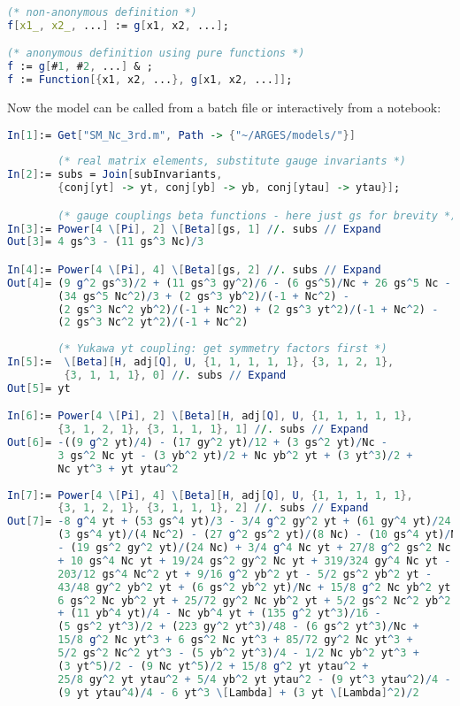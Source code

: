 \documentclass{scrartcl}
\begin{document}
\begin{lstlisting}[language=mathematica,mathescape,columns=flexible,backgroundcolor=\color{light-gray}]
(* non-anonymous definition *)
f[x1_, x2_, ...] := g[x1, x2, ...];

(* anonymous definition using pure functions *)
f := g[#1, #2, ...] & ;
f := Function[{x1, x2, ...}, g[x1, x2, ...]]; 
\end{lstlisting}
Now the model can be called from a batch file or interactively from a notebook:
\begin{lstlisting}[language=mathematica,mathescape,columns=flexible,backgroundcolor=\color{light-gray}]
In[1]:= Get["SM_Nc_3rd.m", Path -> {"~/ARGES/models/"}]
        
        (* real matrix elements, substitute gauge invariants *)        
In[2]:= subs = Join[subInvariants, 
        {conj[yt] -> yt, conj[yb] -> yb, conj[ytau] -> ytau}];

        (* gauge couplings beta functions - here just gs for brevity *)        
In[3]:= Power[4 \[Pi], 2] \[Beta][gs, 1] //. subs // Expand
Out[3]= 4 gs^3 - (11 gs^3 Nc)/3

In[4]:= Power[4 \[Pi], 4] \[Beta][gs, 2] //. subs // Expand
Out[4]= (9 g^2 gs^3)/2 + (11 gs^3 gy^2)/6 - (6 gs^5)/Nc + 26 gs^5 Nc - 
        (34 gs^5 Nc^2)/3 + (2 gs^3 yb^2)/(-1 + Nc^2) - 
        (2 gs^3 Nc^2 yb^2)/(-1 + Nc^2) + (2 gs^3 yt^2)/(-1 + Nc^2) - 
        (2 gs^3 Nc^2 yt^2)/(-1 + Nc^2)
        
        (* Yukawa yt coupling: get symmetry factors first *)
In[5]:=  \[Beta][H, adj[Q], U, {1, 1, 1, 1, 1}, {3, 1, 2, 1}, 
         {3, 1, 1, 1}, 0] //. subs // Expand
Out[5]= yt

In[6]:= Power[4 \[Pi], 2] \[Beta][H, adj[Q], U, {1, 1, 1, 1, 1}, 
        {3, 1, 2, 1}, {3, 1, 1, 1}, 1] //. subs // Expand
Out[6]= -((9 g^2 yt)/4) - (17 gy^2 yt)/12 + (3 gs^2 yt)/Nc - 
        3 gs^2 Nc yt - (3 yb^2 yt)/2 + Nc yb^2 yt + (3 yt^3)/2 + 
        Nc yt^3 + yt ytau^2
        
In[7]:= Power[4 \[Pi], 4] \[Beta][H, adj[Q], U, {1, 1, 1, 1, 1}, 
        {3, 1, 2, 1}, {3, 1, 1, 1}, 2] //. subs // Expand
Out[7]= -8 g^4 yt + (53 gs^4 yt)/3 - 3/4 g^2 gy^2 yt + (61 gy^4 yt)/24 - 
        (3 gs^4 yt)/(4 Nc^2) - (27 g^2 gs^2 yt)/(8 Nc) - (10 gs^4 yt)/Nc
        - (19 gs^2 gy^2 yt)/(24 Nc) + 3/4 g^4 Nc yt + 27/8 g^2 gs^2 Nc yt
        + 10 gs^4 Nc yt + 19/24 gs^2 gy^2 Nc yt + 319/324 gy^4 Nc yt - 
        203/12 gs^4 Nc^2 yt + 9/16 g^2 yb^2 yt - 5/2 gs^2 yb^2 yt - 
        43/48 gy^2 yb^2 yt + (6 gs^2 yb^2 yt)/Nc + 15/8 g^2 Nc yb^2 yt -
        6 gs^2 Nc yb^2 yt + 25/72 gy^2 Nc yb^2 yt + 5/2 gs^2 Nc^2 yb^2 yt
        + (11 yb^4 yt)/4 - Nc yb^4 yt + (135 g^2 yt^3)/16 - 
        (5 gs^2 yt^3)/2 + (223 gy^2 yt^3)/48 - (6 gs^2 yt^3)/Nc + 
        15/8 g^2 Nc yt^3 + 6 gs^2 Nc yt^3 + 85/72 gy^2 Nc yt^3 + 
        5/2 gs^2 Nc^2 yt^3 - (5 yb^2 yt^3)/4 - 1/2 Nc yb^2 yt^3 + 
        (3 yt^5)/2 - (9 Nc yt^5)/2 + 15/8 g^2 yt ytau^2 + 
        25/8 gy^2 yt ytau^2 + 5/4 yb^2 yt ytau^2 - (9 yt^3 ytau^2)/4 - 
        (9 yt ytau^4)/4 - 6 yt^3 \[Lambda] + (3 yt \[Lambda]^2)/2
        

\end{lstlisting}
\end{document}
